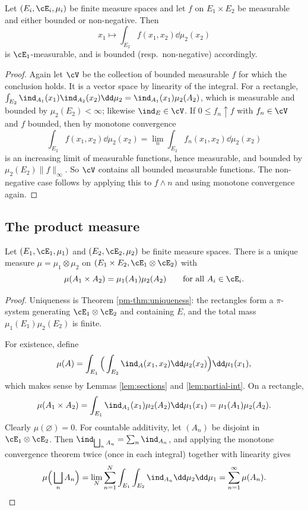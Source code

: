 \begin{lemma}\label{lem:partial-int}
	Let $(E_i,\cE_i,\mu_i)$ be finite measure spaces and let $f$ on $E_1\times E_2$ be measurable and either bounded or non-negative. Then
	$$
	x_1 \longmapsto \int_{E_2} f(x_1,x_2)\dd\mu_2(x_2)
	$$
	is $\cE_1$-measurable, and is bounded (resp.\ non-negative) accordingly.
\end{lemma}
\begin{proof}
	Again let $\cV$ be the collection of bounded measurable $f$ for which the conclusion holds. It is a vector space by linearity of the integral. For a rectangle, $\int_{E_2}\ind_{A_1}(x_1)\ind_{A_2}(x_2)\dd\mu_2 = \ind_{A_1}(x_1)\mu_2(A_2)$, which is measurable and bounded by $\mu_2(E_2)<\infty$; likewise $\ind_E \in \cV$. If $0 \leq f_n \uparrow f$ with $f_n \in \cV$ and $f$ bounded, then by monotone convergence
	$$
	\int_{E_2} f(x_1,x_2)\dd\mu_2(x_2) = \lim_n \int_{E_2} f_n(x_1,x_2)\dd\mu_2(x_2)
	$$
	is an increasing limit of measurable functions, hence measurable, and bounded by $\mu_2(E_2)\|f\|_\infty$. So $\cV$ contains all bounded measurable functions. The non-negative case follows by applying this to $f \wedge n$ and using monotone convergence again.
\end{proof}

\subsection{The product measure}

\begin{theorem}\label{thm:product}
	Let $(E_1,\cE_1,\mu_1)$ and $(E_2,\cE_2,\mu_2)$ be finite measure spaces. There is a unique measure $\mu = \mu_1\otimes\mu_2$ on $(E_1\times E_2, \cE_1\otimes\cE_2)$ with
	$$
	\mu(A_1\times A_2) = \mu_1(A_1)\mu_2(A_2) \qquad \text{for all } A_i \in \cE_i.
	$$
\end{theorem}
\begin{proof}
	Uniqueness is Theorem \ref{pm-thm:uniqueness}: the rectangles form a $\pi$-system generating $\cE_1\otimes\cE_2$ and containing $E$, and the total mass $\mu_1(E_1)\mu_2(E_2)$ is finite.

	For existence, define
	$$
	\mu(A) = \int_{E_1}\Big( \int_{E_2}\ind_A(x_1,x_2)\dd\mu_2(x_2)\Big)\dd\mu_1(x_1),
	$$
	which makes sense by Lemmas \ref{lem:sections} and \ref{lem:partial-int}. On a rectangle,
	$$
	\mu(A_1\times A_2) = \int_{E_1}\ind_{A_1}(x_1)\mu_2(A_2)\dd\mu_1(x_1) = \mu_1(A_1)\mu_2(A_2).
	$$
	Clearly $\mu(\varnothing) = 0$. For countable additivity, let $(A_n)$ be disjoint in $\cE_1\otimes\cE_2$. Then $\ind_{\bigsqcup_n A_n} = \sum_n \ind_{A_n}$, and applying the monotone convergence theorem twice (once in each integral) together with linearity gives
	$$
	\mu\Big(\bigsqcup_n A_n\Big) = \lim_{N}\sum_{n=1}^N \int_{E_1}\int_{E_2}\ind_{A_n}\dd\mu_2\dd\mu_1 = \sum_{n=1}^\infty \mu(A_n). \qedhere
	$$
\end{proof}


